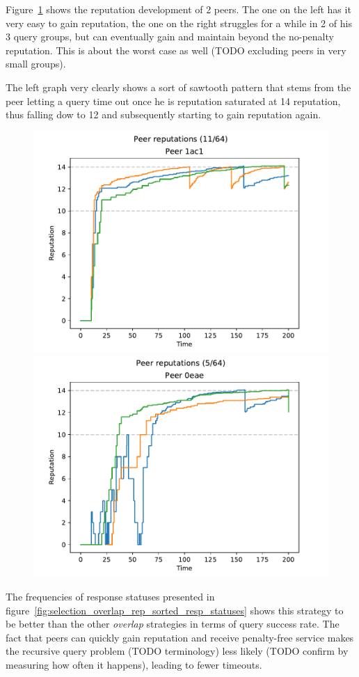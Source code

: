 Figure~\ref{fig:selection_overlap_rep_sorted_peer_reps} shows the reputation
development of 2 peers. The one on the left has it very easy to gain reputation,
the one on the right struggles for a while in 2 of his 3 query groups, but can
eventually gain and maintain beyond the no-penalty reputation. This is about the
worst case as well (TODO excluding peers in very small groups).

The left graph very clearly shows a sort of sawtooth pattern that stems from the
peer letting a query time out once he is reputation saturated at 14 reputation,
thus falling dow to 12 and subsequently starting to gain reputation again.

\begin{figure}[t]
\centering
\includegraphics[width=0.5\columnwidth]{figures/selection_overlap_rep_sorted_peer_reps_11_of_64}%
\includegraphics[width=0.5\columnwidth]{figures/selection_overlap_rep_sorted_peer_reps_5_of_64}
\label{fig:selection_overlap_rep_sorted_peer_reps}
\end{figure}

The frequencies of response statuses presented in
figure~\ref{fig:selection_overlap_rep_sorted_resp_statuses} shows this
strategy to be better than the other \emph{overlap} strategies in terms of query
success rate. The fact that peers can quickly gain reputation and receive
penalty-free service makes the recursive query problem (TODO terminology) less
likely (TODO confirm by measuring how often it happens), leading to fewer
timeouts.

